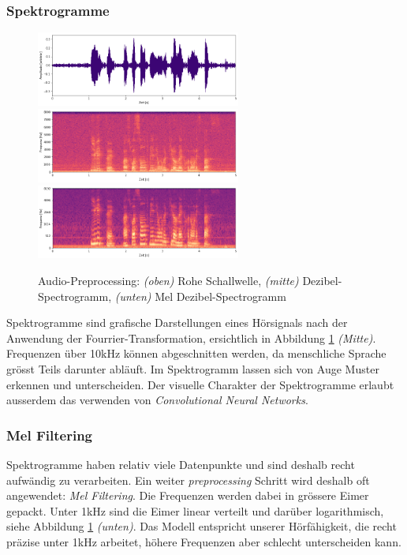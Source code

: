 \subsubsection{Spektrogramme}
\begin{figure}[hbt]
	\centering
		\includegraphics[width=0.6\textwidth]{assets/audio_raw.png}
		\includegraphics[width=0.6\textwidth]{assets/audio_log.png}
		\includegraphics[width=0.6\textwidth]{assets/audio_mel.png}
	\centering
	\caption{Audio-Preprocessing: \textit{(oben)} Rohe Schallwelle, \textit{(mitte)}
		     Dezibel-Spectrogramm, 
		     \textit{(unten)} Mel Dezibel-Spectrogramm}
	\label{img:preprocessing}
\end{figure}
Spektrogramme sind grafische Darstellungen eines Hörsignals nach der Anwendung der Fourrier-Transformation\parencite[]['Spectrograms']{fourrier}, ersichtlich in Abbildung \ref{img:preprocessing} \textit{(Mitte)}. Frequenzen über 10kHz können abgeschnitten werden, da menschliche Sprache grösst Teils darunter abläuft\parencite{tenkHz}. Im Spektrogramm lassen sich von Auge Muster erkennen und unterscheiden. Der visuelle Charakter der Spektrogramme erlaubt ausserdem das verwenden von \textit{Convolutional Neural Networks}.

\subsubsection{Mel Filtering}

Spektrogramme haben relativ viele Datenpunkte und sind deshalb recht aufwändig zu verarbeiten. Ein weiter \textit{preprocessing} Schritt wird deshalb oft angewendet: \textit{Mel Filtering}\parencite{mel}. Die Frequenzen werden dabei in grössere Eimer gepackt. Unter 1kHz sind die Eimer linear verteilt und darüber logarithmisch, siehe Abbildung \ref{img:preprocessing} \textit{(unten)}. Das Modell entspricht unserer Hörfähigkeit, die recht präzise unter 1kHz arbeitet, höhere Frequenzen aber schlecht unterscheiden kann\parencite{tenkHz}. 

